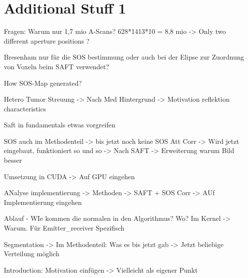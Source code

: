 \chapter{Additional Stuff 1}
\label{app:stuff1}

Fragen: Warum nur 1,7 mio A-Scans? 628*1413*10 = 8,8 mio -> Only two different aperture positions ?

Bresenham nur für die SOS bestimmung oder auch bei der Elipse zur Zuordnung von Voxeln beim SAFT verwendet?

How SOS-Map generated?


Hetero Tumor Streuung -> Nach Med Hintergrund -> Motivation reflektion characteristics

Saft in fundamentals etwas vorgreifen 

SOS auch im Methodenteil -> bis jetzt noch keine SOS Att Corr -> Wird jetzt eingebaut, funktioniert so und so -> Nach SAFT -> Erweiterung warum Bild besser

Umsetzung in CUDA -> Auf GPU eingehen

ANalyse implementierung -> Methoden -> SAFT + SOS Corr -> AUf Implementierung eingehen


Ablauf - WIe kommen die normalen in den Algorithmus? Wo? Im Kernel -> Warum. Für Emitter_receiver Spezifisch


Segmentation -> Im Methodenteil: Was es bis jetzt gab -> Jetzt beliebige Verteilung möglich


Introduction: Motivation einfügen -> Vielleicht als eigener Punkt 